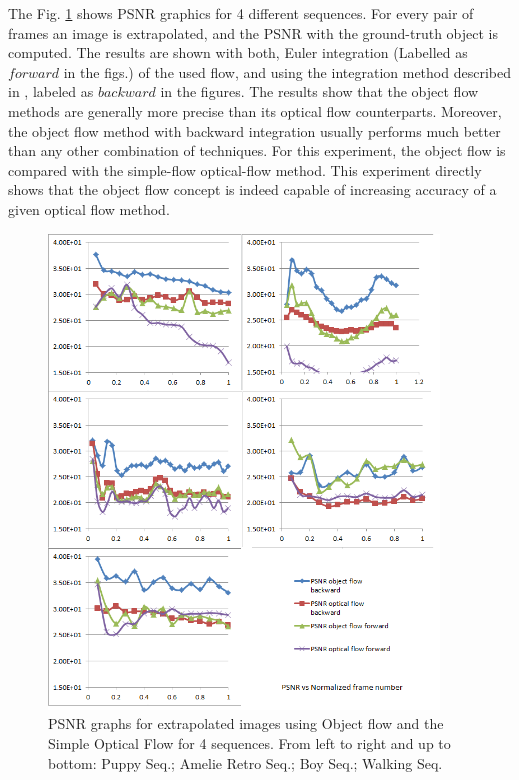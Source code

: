 The Fig. \ref{of_res} shows PSNR graphics for 4 different sequences. For every pair of frames an image is extrapolated, and the PSNR with the ground-truth object is computed.
The results are shown with both, Euler integration (Labelled as $forward$ in the figs.) of the used flow, 
and using the integration method described in \cite{c20}, labeled as $backward$ in the figures. The results show that the object flow methods are generally more precise than its optical flow 
counterparts. Moreover, the object flow method with backward integration usually performs much better than any other combination of techniques. For this experiment, the object flow is compared with the simple-flow optical-flow method. This experiment directly shows that the object flow concept is indeed capable of increasing accuracy of a given optical flow method. 

   \begin{figure}[hb]
      \centering
      \includegraphics[width=0.925\textwidth]{../images/psnr_v2.png}
      \caption{PSNR graphs for extrapolated images using Object flow and the Simple Optical Flow for 4 sequences. From left to right and up to bottom: Puppy Seq.; Amelie Retro Seq.; Boy Seq.; Walking Seq.}
      \label{of_res}
   \end{figure}
	\setlength{\belowcaptionskip}{-10pt}


